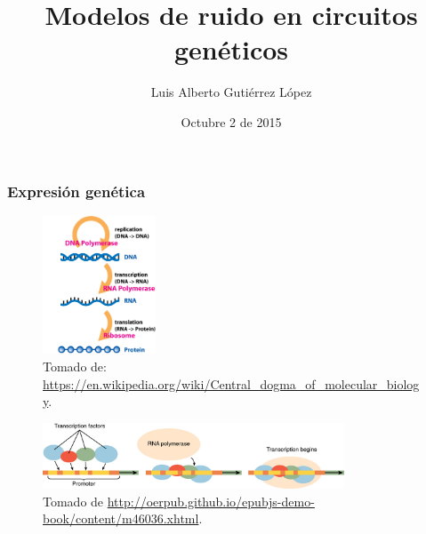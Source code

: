 \documentclass[10pt]{beamer}
\title[Ruido en circuitos gen\'eticos]{Modelos de ruido en circuitos gen\'eticos}
\author{Luis Alberto Guti\'errez L\'opez}
\institute[Uniandes]{Universidad de los Andes\\
Departamento de F\'isica\\
\medskip
}
\date{Octubre 2 de 2015}
\begin{document}
\begin{frame}
\titlepage
\end{frame}

\begin{frame}
\frametitle{Expresi\'on gen\'etica}

\begin{figure}[p]
    \centering
    \includegraphics[width=0.3\textwidth]{dogma.jpg}\\
    \tiny Tomado de: \url{https://en.wikipedia.org/wiki/Central_dogma_of_molecular_biology}.
\end{figure}

\begin{figure}[p]
    \centering
    \includegraphics[width=0.8\textwidth]{tf1.jpg}\\
    \tiny Tomado de \url{http://oerpub.github.io/epubjs-demo-book/content/m46036.xhtml}.
\end{figure}
\end{frame}
\end{document}
